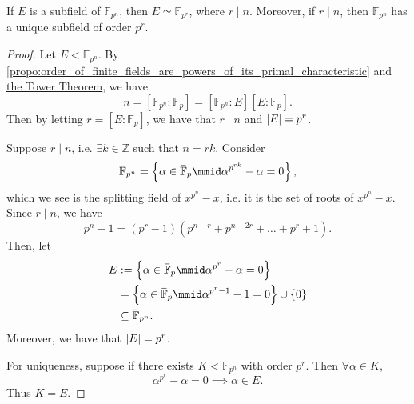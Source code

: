 \documentclass[notoc,notitlepage]{tufte-book}
\begin{document}
\begin{thm}\label{thm:subfields_of_finite_fields}
  If $E$ is a subfield of $\mathbb{F}_{p^n}$, then $E \simeq \mathbb{F}_{p^r}$,
  where $r \mid n$. Moreover, if $r \mid n$, then $\mathbb{F}_{p^n}$ has a
  unique subfield of order $p^r$.
\end{thm}

\begin{proof}
   Let $E < \mathbb{F}_{p^n}$. By
  \cref{propo:order_of_finite_fields_are_powers_of_its_primal_characteristic}
  and \hyperref[thm:tower_theorem]{the Tower Theorem}, we have
  \begin{equation*}
    n = [ \mathbb{F}_{p^n} : \mathbb{F}_p ] = [ \mathbb{F}_{p^n} : E ][ E :
    \mathbb{F}_p ].
  \end{equation*}
  Then by letting $r = [ E : \mathbb{F}_p ]$, we have that $r \mid n$ and
  $\left|E\right| = p^r$.

  \noindent
   Suppose $r \mid n$, i.e. $\exists k \in \mathbb{Z}$ such
  that $n = rk$. Consider
  \begin{equation*}
    \mathbb{F}_{p^n} = \left\{ \alpha \in \bar{\mathbb{F}}_p \mmid
    \alpha^{p^{rk}} - \alpha = 0 \right\},
  \end{equation*}
  which
  we see is the splitting field of $x^{p^n} - x$, i.e. it is the set of roots of
  $x^{p^n} - x$. Since $r \mid n$, we have
  \begin{equation*}
    p^n - 1 = (p^r - 1)(p^{n - r} + p^{n - 2r} + \hdots + p^r + 1).
  \end{equation*}
  Then, let
  \begin{align*}
    E &:= \left\{ \alpha \in \bar{\mathbb{F}}_p \mmid \alpha^{p^r} - \alpha = 0
    \right\} \\
      &= \left\{ \alpha \in \bar{\mathbb{F}}_p \mmid \alpha^{p^r - 1} - 1 = 0
      \right\} \cup \{ 0 \} \\
      &\subseteq \bar{\mathbb{F}}_{p^n}.
  \end{align*}
  Moreover, we have that $\left|E\right| = p^r$.

  For uniqueness, suppose if there exists $K < \mathbb{F}_{p^n}$ with order
  $p^r$. Then $\forall \alpha \in K$,
  \begin{equation*}
    \alpha^{p^r} - \alpha = 0 \implies \alpha \in E.
  \end{equation*}
  Thus $K = E$.
\end{proof}
\end{document}
